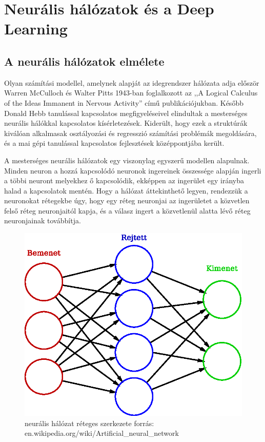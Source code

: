 \chapter{Neurális hálózatok és a Deep Learning}\label{chap:neuralis-halozatok-es-a-deep-learning}

\section{A neurális hálózatok elmélete}
\label{sect:neuralNetworkTheory}
Olyan számítási modellel, amelynek alapját az idegrendszer hálózata adja először  Warren McCulloch és Walter Pitts 1943-ban foglalkozott az ,,A Logical Calculus of the Ideas Immanent in Nervous Activity'' című publikációjukban. Később Donald Hebb tanulással kapcsolatos megfigyeléseivel elindultak a mesterséges neurális hálókkal kapcsolatos kísérletezések.\cite{neural2006}\cite{nielsen2015}
Kiderült, hogy ezek a struktúrák kiválóan alkalmasak osztályozási és regresszió számítási problémák megoldására, és a mai gépi tanulással kapcsolatos fejlesztések középpontjába került.

A mesterséges neurális hálózatok egy viszonylag egyszerű modellen alapulnak. Minden neuron a hozzá kapcsolódó neuronok ingereinek összessége alapján ingerli a többi neuront melyekhez ő kapcsolódik, ekképpen az ingerület egy irányba halad a kapcsolatok mentén. Hogy a hálózat áttekinthető legyen, rendezzük a neuronokat rétegekbe úgy, hogy egy réteg neuronjai az ingerületet a közvetlen felső réteg neuronjaitól kapja, és a válasz ingert a közvetlenül alatta lévő réteg neuronjainak továbbítja.

\begin{figure}[h]
	\centering
	\includegraphics[width=0.3\columnwidth]{fig/neural_network}
	\caption{neurális hálózat réteges szerkezete \footnotesize forrás: en.wikipedia.org/wiki/Artificial\_neural\_network}
	\label{fig:neuralNet}
\end{figure}

